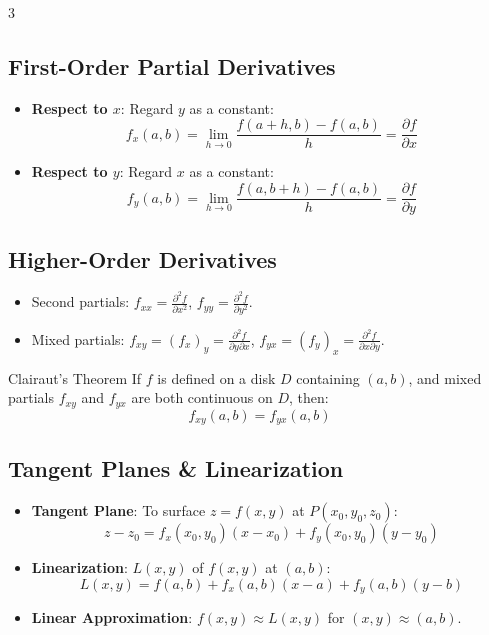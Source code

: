 \documentclass[10pt,landscape,a4paper]{article}
\begin{document}
\begin{multicols*}{3}
\subsection{First-Order Partial Derivatives}
\begin{itemize}
    \item \textbf{Respect to $x$}: Regard $y$ as a constant:
    \[ f_x(a,b) = \lim_{h \to 0} \frac{f(a+h,b) - f(a,b)}{h} = \frac{\partial f}{\partial x} \]
    \item \textbf{Respect to $y$}: Regard $x$ as a constant:
    \[ f_y(a,b) = \lim_{h \to 0} \frac{f(a,b+h) - f(a,b)}{h} = \frac{\partial f}{\partial y} \]
\end{itemize}

\subsection{Higher-Order Derivatives}
\begin{itemize}
    \item Second partials: $f_{xx} = \frac{\partial^2 f}{\partial x^2}$, $f_{yy} = \frac{\partial^2 f}{\partial y^2}$.
    \item Mixed partials: $f_{xy} = (f_x)_y = \frac{\partial^2 f}{\partial y \partial x}$, $f_{yx} = (f_y)_x = \frac{\partial^2 f}{\partial x \partial y}$.
\end{itemize}

\begin{theorembox}{Clairaut's Theorem}
If $f$ is defined on a disk $D$ containing $(a,b)$, and mixed partials $f_{xy}$ and $f_{yx}$ are both continuous on $D$, then:
\[ f_{xy}(a,b) = f_{yx}(a,b) \]
\end{theorembox}

\subsection{Tangent Planes \& Linearization}
\begin{itemize}
    \item \textbf{Tangent Plane}: To surface $z=f(x,y)$ at $P(x_0, y_0, z_0)$:
    \[ z - z_0 = f_x(x_0,y_0)(x-x_0) + f_y(x_0,y_0)(y-y_0) \]
    \item \textbf{Linearization}: $L(x,y)$ of $f(x,y)$ at $(a,b)$:
    \[ L(x,y) = f(a,b) + f_x(a,b)(x-a) + f_y(a,b)(y-b) \]
    \item \textbf{Linear Approximation}: $f(x,y) \approx L(x,y)$ for $(x,y) \approx (a,b)$.
\end{itemize}


\end{multicols*}
\end{document}
